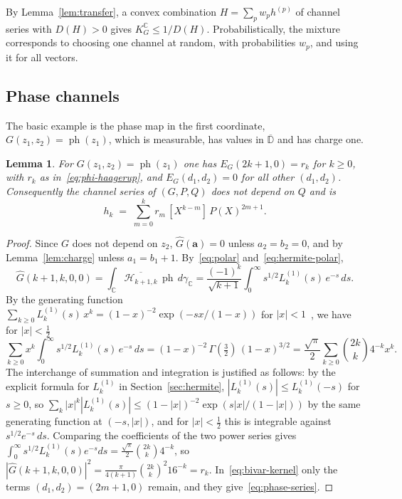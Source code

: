 \documentclass[11pt,reqno]{amsart}
\newtheorem{lemma}[theorem]{Lemma}
\theoremstyle{definition}
\numberwithin{equation}{section}
\newcommand{\C}{\mathbb{C}}
\newcommand{\D}{\mathbb{D}}
\newcommand{\KGC}{K_G^{\C}}
\newcommand{\ph}{\operatorname{ph}}
\newcommand{\gC}{\gamma_{\C}}
\begin{document}
By Lemma~\ref{lem:transfer}, a convex combination $H=\sum_pw_ph^{(p)}$ of channel series with $D(H)>0$ gives $\KGC\le1/D(H)$. Probabilistically, the mixture corresponds to choosing one channel at random, with probabilities $w_p$, and using it for all vectors.

\subsection{Phase channels}\label{sec:phase}
The basic example is the phase map in the first coordinate, $G(z_1,z_2)=\ph(z_1)$, which is measurable, has values in $\overline{\D}$ and has charge one.

\begin{lemma}\label{lem:phase-energy}
For $G(z_1,z_2)=\ph(z_1)$ one has $E_G(2k+1,0)=r_k$ for $k\ge0$, with $r_k$ as in~\eqref{eq:phi-haagerup}, and $E_G(d_1,d_2)=0$ for all other $(d_1,d_2)$. Consequently the channel series of $(G,P,Q)$ does not depend on $Q$ and is
\begin{equation}\label{eq:phase-series}
  h_k \;=\; \sum_{m=0}^k r_m\, [X^{k-m}]\, P(X)^{2m+1}.
\end{equation}
\end{lemma}

\begin{proof}
Since $G$ does not depend on $z_2$, $\widehat{G}(\mathbf{a})=0$ unless $a_2=b_2=0$, and by Lemma~\ref{lem:charge} unless $a_1=b_1+1$. By~\eqref{eq:polar} and~\eqref{eq:hermite-polar},
\[
  \widehat{G}(k+1,k,0,0)=\int_\C\overline{\mathcal{H}_{k+1,k}}\,\ph\,d\gC=\frac{(-1)^k}{\sqrt{k+1}}\int_0^\infty s^{1/2}L_k^{(1)}(s)\,e^{-s}\,ds .
\]
By the generating function $\sum_{k\ge0}L_k^{(1)}(s)\,x^k=(1-x)^{-2}\exp(-sx/(1-x))$ for $|x|<1$~\cite[Section~5.1]{Sze75}, we have for $|x|<\frac12$
\[
  \sum_{k\ge0}x^k\int_0^\infty s^{1/2}L_k^{(1)}(s)\,e^{-s}\,ds=(1-x)^{-2}\,\Gamma(\tfrac32)\,(1-x)^{3/2}=\frac{\sqrt\pi}{2}\sum_{k\ge0}\binom{2k}{k}4^{-k}x^k .
\]
The interchange of summation and integration is justified as follows: by the explicit formula for $L_k^{(1)}$ in Section~\ref{sec:hermite}, $|L_k^{(1)}(s)|\le L_k^{(1)}(-s)$ for $s\ge0$, so $\sum_k|x|^k|L_k^{(1)}(s)|\le(1-|x|)^{-2}\exp(s|x|/(1-|x|))$ by the same generating function at $(-s,|x|)$, and for $|x|<\frac12$ this is integrable against $s^{1/2}e^{-s}\,ds$. Comparing the coefficients of the two power series gives $\int_0^\infty s^{1/2}L_k^{(1)}(s)e^{-s}ds=\frac{\sqrt\pi}2\binom{2k}{k}4^{-k}$, so $|\widehat{G}(k+1,k,0,0)|^2=\frac{\pi}{4(k+1)}\binom{2k}{k}^2 16^{-k}=r_k$. In~\eqref{eq:bivar-kernel} only the terms $(d_1,d_2)=(2m+1,0)$ remain, and they give~\eqref{eq:phase-series}.
\end{proof}
\end{document}
